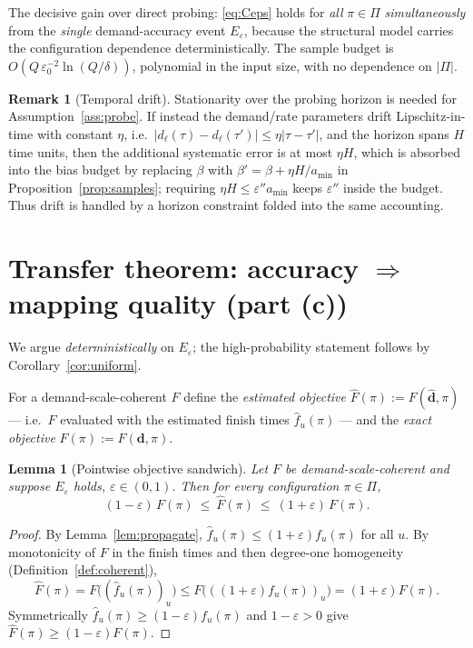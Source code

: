 \documentclass{amsart}
\newtheorem{lemma}{Lemma}
\theoremstyle{definition}
\newtheorem{remark}{Remark}
\begin{document}
The decisive gain over direct probing: \eqref{eq:Ceps} holds for \emph{all}
$\pi\in\Pi$ \emph{simultaneously} from the \emph{single} demand-accuracy event
$E_\varepsilon$, because the structural model carries the configuration
dependence deterministically. The sample budget is $O(Q\,\varepsilon_0^{-2}
\ln(Q/\delta))$, polynomial in the input size, with no dependence on $|\Pi|$.

\begin{remark}[Temporal drift]\label{rem:drift}
Stationarity over the probing horizon is needed for Assumption~\ref{ass:probe}.
If instead the demand/rate parameters drift Lipschitz-in-time with constant
$\eta$, i.e.\ $|d_\ell(\tau)-d_\ell(\tau')|\le\eta|\tau-\tau'|$, and the horizon
spans $H$ time units, then the additional systematic error is at most $\eta H$,
which is absorbed into the bias budget by replacing $\beta$ with
$\beta'=\beta+\eta H/a_{\min}$ in Proposition~\ref{prop:samples}; requiring
$\eta H\le\varepsilon'' a_{\min}$ keeps $\varepsilon''$ inside the budget. Thus
drift is handled by a horizon constraint folded into the same accounting.
\end{remark}

\section{Transfer theorem: accuracy $\Rightarrow$ mapping quality (part (c))}\label{sec:transfer}

We argue \emph{deterministically} on $E_\varepsilon$; the high-probability
statement follows by Corollary~\ref{cor:uniform}.

For a demand-scale-coherent $F$ define the \emph{estimated objective}
$\widehat F(\pi):=F(\widehat{\mathbf d},\pi)$ — i.e.\ $F$ evaluated with the
estimated finish times $\widehat f_u(\pi)$ — and the \emph{exact objective}
$F(\pi):=F(\mathbf d,\pi)$.

\begin{lemma}[Pointwise objective sandwich]\label{lem:sandwich}
Let $F$ be demand-scale-coherent and suppose $E_\varepsilon$ holds,
$\varepsilon\in(0,1)$. Then for every configuration $\pi\in\Pi$,
\begin{equation}\label{eq:sandwich}
(1-\varepsilon)\,F(\pi)\ \le\ \widehat F(\pi)\ \le\ (1+\varepsilon)\,F(\pi).
\end{equation}
\end{lemma}

\begin{proof}
By Lemma~\ref{lem:propagate}, $\widehat f_u(\pi)\le(1+\varepsilon)f_u(\pi)$ for
all $u$. By monotonicity of $F$ in the finish times and then degree-one
homogeneity (Definition~\ref{def:coherent}),
\[
\widehat F(\pi)=F\big((\widehat f_u(\pi))_u\big)\le F\big(((1+\varepsilon)f_u(\pi))_u\big)
=(1+\varepsilon)F(\pi).
\]
Symmetrically $\widehat f_u(\pi)\ge(1-\varepsilon)f_u(\pi)$ and $1-\varepsilon>0$
give $\widehat F(\pi)\ge(1-\varepsilon)F(\pi)$.
\end{proof}
\end{document}
